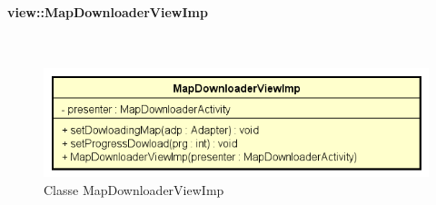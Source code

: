 \documentclass[../DefinizioneDiProdotto.tex]{subfiles}
\begin{document}
\paragraph{view::MapDownloaderViewImp}
\
\begin{figure}[H]
	\centering
	\includegraphics[width=\maxwidth]{img/MapDownloaderViewImp.png}
	\caption{Classe MapDownloaderViewImp}\label{fig:view::MapDownloaderViewImp} 
\end{figure}
\end{document}
